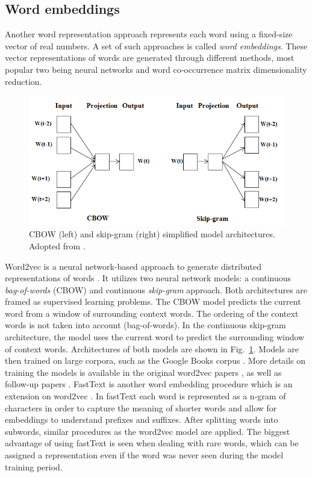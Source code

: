 \subsection{Word embeddings}
\label{sec:embedding}

Another word representation approach represents each word using a fixed-size
vector of real numbers. A set of such approaches is called \textit{word
embeddings}. These vector representations of words are generated through
different methods, most popular two being neural networks and word co-occurrence
matrix dimensionality reduction.

\begin{figure}
	\includegraphics[scale=0.65]{skip_gram_cbow.png}
	\caption{CBOW (left) and skip-gram (right) simplified model architectures. Adopted from 
	\citep{suleiman2017deep}. }
	\label{fig:skip_gram_cbow}
\end{figure}

Word2vec is a neural network-based approach to generate distributed
representations of words \citep{mikolov2013distributed}.  It utilizes two
neural network models: a continuous \textit{bag-of-words} (CBOW) and continuous
\textit{skip-gram} approach.  Both architectures are framed as supervised learning problems.
The CBOW model predicts the current word from a window of
surrounding context words. 
The ordering of the context words is not taken into
account (bag-of-words). In the continuous skip-gram architecture, the model
uses the current word to predict the surrounding window of context words.
Architectures of both models are shown in Fig.~\ref{fig:skip_gram_cbow}. 
Models are then trained on large corpora, such as the Google Books corpus 
\citep{lin2012syntactic}. 
More details on training the models is available in the original word2vec papers
\citep{mikolov2013distributed, mikolov2013efficient}, as well as follow-up papers
\citep{goldberg2014word2vec, rong2014word2vec}.
FastText is another word embedding procedure which is an extension on word2vec
\citep{bojanowski2017enriching}. In fastText each word is represented as a
n-gram of characters in order to capture the meaning of shorter words and allow
for embeddings to understand prefixes and suffixes. After splitting words into
subwords, similar procedures as the word2vec model are applied. 
The biggest advantage of using fastText is seen when dealing 
with rare words, which can be assigned a representation even if the word was
never seen during the model training period. 

